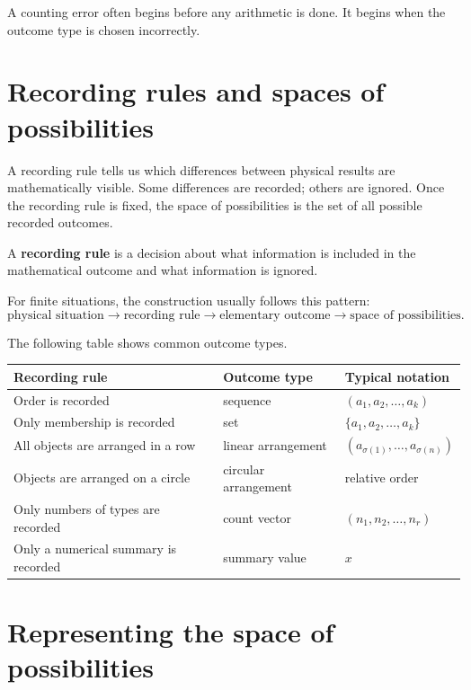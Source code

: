 \begin{remarkbox}
A counting error often begins before any arithmetic is done. It begins when the outcome type is chosen incorrectly.
\end{remarkbox}

\section{Recording rules and spaces of possibilities}

A recording rule tells us which differences between physical results are mathematically visible. Some differences are recorded; others are ignored. Once the recording rule is fixed, the space of possibilities is the set of all possible recorded outcomes.

\begin{definitionbox}
A \textbf{recording rule} is a decision about what information is included in the mathematical outcome and what information is ignored.
\end{definitionbox}

For finite situations, the construction usually follows this pattern:
\[
\text{physical situation}
\longrightarrow
\text{recording rule}
\longrightarrow
\text{elementary outcome}
\longrightarrow
\text{space of possibilities}.
\]

The following table shows common outcome types.

\begin{center}
\begin{tabular}{lll}
\toprule
Recording rule & Outcome type & Typical notation \\
\midrule
Order is recorded & sequence & \((a_1,a_2,\ldots,a_k)\) \\
Only membership is recorded & set & \(\{a_1,a_2,\ldots,a_k\}\) \\
All objects are arranged in a row & linear arrangement & \((a_{\sigma(1)},\ldots,a_{\sigma(n)})\) \\
Objects are arranged on a circle & circular arrangement & relative order \\
Only numbers of types are recorded & count vector & \((n_1,n_2,\ldots,n_r)\) \\
Only a numerical summary is recorded & summary value & \(x\) \\
\bottomrule
\end{tabular}
\end{center}

\section{Representing the space of possibilities}

